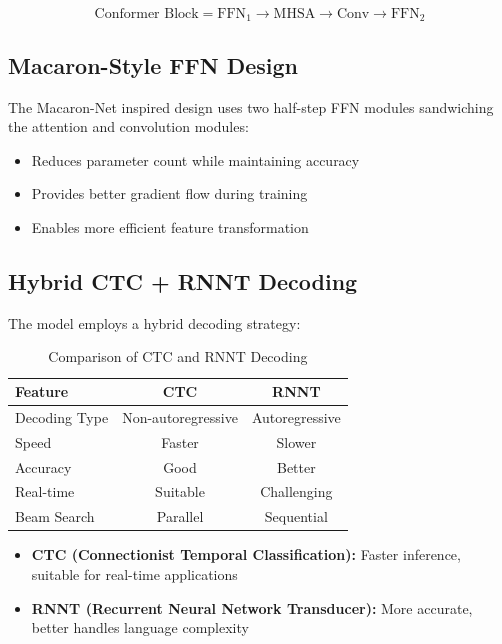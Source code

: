 \documentclass[12pt,a4paper]{article}
\begin{document}
\begin{equation}
\text{Conformer Block} = \text{FFN}_1 \rightarrow \text{MHSA} \rightarrow \text{Conv} \rightarrow \text{FFN}_2
\end{equation}

\subsection{Macaron-Style FFN Design}

The Macaron-Net inspired design uses two half-step FFN modules sandwiching the attention and convolution modules:

\begin{itemize}[leftmargin=*]
\item Reduces parameter count while maintaining accuracy
\item Provides better gradient flow during training
\item Enables more efficient feature transformation
\end{itemize}

\subsection{Hybrid CTC + RNNT Decoding}

The model employs a hybrid decoding strategy:

\begin{table}[h]
\centering
\caption{Comparison of CTC and RNNT Decoding}
\begin{tabular}{@{}lcc@{}}
\toprule
\textbf{Feature} & \textbf{CTC} & \textbf{RNNT} \\
\midrule
Decoding Type & Non-autoregressive & Autoregressive \\
Speed & Faster & Slower \\
Accuracy & Good & Better \\
Real-time & Suitable & Challenging \\
Beam Search & Parallel & Sequential \\
\bottomrule
\end{tabular}
\end{table}

\begin{itemize}[leftmargin=*]
\item \textbf{CTC (Connectionist Temporal Classification):} Faster inference, suitable for real-time applications
\item \textbf{RNNT (Recurrent Neural Network Transducer):} More accurate, better handles language complexity
\end{itemize}
\end{document}
